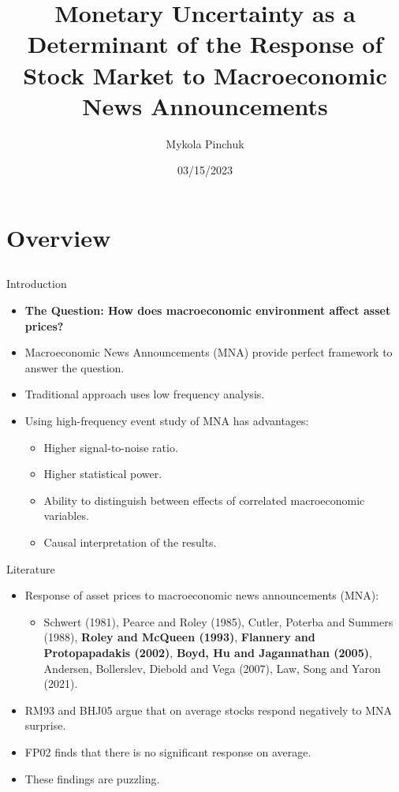 \documentclass{beamer}
\title[Monetary Uncertainty as a Determinant of the Response of Stock Market to MNAs]{Monetary Uncertainty as a Determinant of the Response of Stock Market to Macroeconomic News Announcements\\ }
\author{Mykola Pinchuk}
\date{03/15/2023}
\begin{document}
\begin{frame}
  \titlepage
\end{frame}

\section{Overview}
\subsection{}


\begin{frame}{Introduction}
\begin{itemize}
    \item {\textbf{The Question: How does macroeconomic environment affect asset prices?}}
    \item {Macroeconomic News Announcements (MNA) provide perfect framework to answer the question.}    
    \item {Traditional approach uses low frequency analysis.}    
    \item {Using high-frequency event study of MNA has advantages:}
    \begin{itemize}
        \item {Higher signal-to-noise ratio.}
        \item {Higher statistical power.}
        \item {Ability to distinguish between effects of correlated macroeconomic variables.}
        \item {Causal interpretation of the results.}
    \end{itemize}
\end{itemize}
\end{frame}


\begin{frame}{Literature}
\begin{itemize}
    \item {Response of asset prices to macroeconomic news announcements (MNA):}
    \begin{itemize}
        \item {Schwert (1981), Pearce and Roley (1985), Cutler, Poterba and Summers (1988), \textbf{Roley and McQueen (1993)}, \textbf{Flannery and Protopapadakis (2002)}, \textbf{Boyd, Hu and Jagannathan (2005)}, Andersen, Bollerslev, Diebold and Vega (2007), Law, Song and Yaron (2021).}
    \end{itemize}
    \item {RM93 and BHJ05 argue that on average stocks respond negatively to MNA surprise.}
    \item {FP02 finds that there is no significant response on average.}
    \item {These findings are puzzling.}
\end{itemize}
\end{frame}
\end{document}
